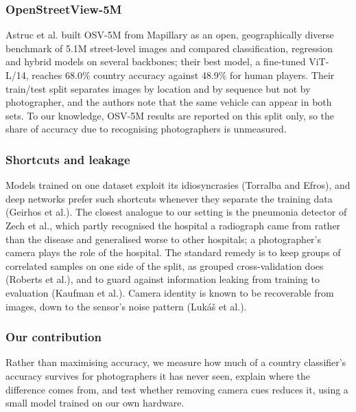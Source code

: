 \documentclass[11pt]{article}
\begin{document}
\subsubsection{OpenStreetView-5M}
Astruc et al. built OSV-5M from Mapillary as an open, geographically diverse
benchmark of 5.1M street-level images and compared classification, regression and hybrid models on several
backbones; their best model, a fine-tuned ViT-L/14, reaches 68.0\% country accuracy against 48.9\% for human
players. Their train/test split separates images by location and by sequence but not by photographer, and
the authors note that the same vehicle can appear in both sets. To our knowledge, OSV-5M results are reported on this split only, so the share of accuracy due to recognising photographers is unmeasured.

\subsubsection{Shortcuts and leakage}
Models trained on one dataset exploit its idiosyncrasies (Torralba and
Efros), and deep networks prefer such shortcuts whenever they separate the training data (Geirhos et al.).
The closest analogue to our setting is the pneumonia detector of Zech et al., which partly recognised the
hospital a radiograph came from rather than the disease and generalised worse to other hospitals; a
photographer's camera plays the role of the hospital. The standard remedy is to keep groups of correlated
samples on one side of the split, as grouped cross-validation does (Roberts et al.), and to guard against
information leaking from training to evaluation (Kaufman et al.). Camera identity is known to be recoverable from images, down to the sensor's noise pattern (Luk\'a\v{s} et al.).

\subsubsection{Our contribution}
Rather than maximising accuracy, we measure how much of a country
classifier's accuracy survives for photographers it has never seen, explain where the difference comes
from, and test whether removing camera cues reduces it, using a small model trained on our own hardware.
\end{document}

